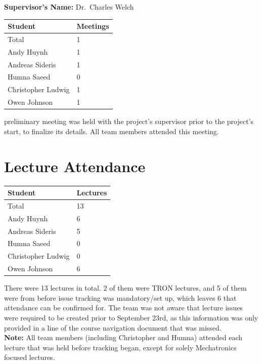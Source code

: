 \documentclass{article}
\begin{document}
\noindent \textbf{Supervisor's Name: } Dr.~Charles Welch

\begin{table}[H]
\centering
\begin{tabular}{ll}
\toprule
\textbf{Student} & \textbf{Meetings}\\
\midrule
Total & 1\\
Andy Huynh  & 1\\
Andreas Sideris & 1\\
Humna Saeed & 0\\
Christopher Ludwig & 1\\
Owen Johnson & 1\\
\bottomrule
\end{tabular}
\end{table}

 preliminary meeting was held with the project's supervisor prior to 
the 
project's start, to finalize its details. All team members attended this 
meeting.

\section{Lecture Attendance}

\begin{table}[H]
\centering
\begin{tabular}{ll}
\toprule
\textbf{Student} & \textbf{Lectures}\\
\midrule
Total & 13\\
Andy Huynh  & 6\\
Andreas Sideris & 5\\
Humna Saeed & 0\\
Christopher Ludwig & 0\\
Owen Johnson & 6\\
\bottomrule
\end{tabular}
\end{table}

There were 13 lectures in total. 2 of them were TRON lectures, and 5 of them 
were from before issue tracking was mandatory/set up, which leaves 6 that 
attendance can be confirmed for. The team was not aware that lecture issues 
were required to be created prior to September 23rd, as this information was 
only provided in a line of the course navigation document that was missed.\\

\noindent \textbf{Note:} All team members (including Christopher and Humna) 
attended each 
lecture that was held before tracking began, except for solely Mechatronics 
focused lectures.
\end{document}
